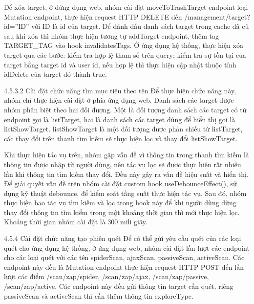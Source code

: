 Để xóa target, ở dứng dụng web, nhóm cài đặt moveToTrashTarget endpoint loại Mutation endpoint, thực hiện request HTTP DELETE đến /management/target?id=”ID” với ID là id của target. Để đánh dấu danh sách target trong cache đã cũ sau khi xóa thì nhóm thực hiện tương tự addTarget endpoint, thêm tag TARGET\_TAG vào hook invalidatesTags. Ở ứng dụng hệ thống, thực hiện xóa target qua các bước: kiểm tra hợp lệ tham số trên query; kiểm tra sự tồn tại của target bằng target id và user id, nếu hợp lệ thì thực hiện cập nhật thuộc tính idDelete của target đó thành true.

4.5.3.2 Cài đặt chức năng tìm mục tiêu theo tên
Để thực hiện chức năng này, nhóm chỉ thực hiện cài đặt ở phía ứng dụng web. Danh sách các target được nhóm phân biệt theo hai đối đượng. Một là đối tượng danh sách các target có từ endpoint gọi là listTarget, hai là danh sách các target dùng để hiển thị gọi là listShowTarget. listShowTarget là một đối tượng được phản chiếu từ listTarget, các thay đổi trên thanh tìm kiếm sẽ thực hiện lọc và thay đổi listShowTarget.

Khi thực hiện tác vụ trên, nhóm gặp vấn đề vì thông tin trong thanh tìm kiếm là thông tin được nhập từ người dùng, nên tác vụ lọc sẽ được thực hiện rất nhiều lần khi thông tin tìm kiếm thay đổi. Đều này gây ra vấn đề hiệu suất và hiển thị. Để giải quyết vấn đề trên nhóm cài đặt custom hook useDebounceEffect(), sử dụng kỹ thuật debounce, để kiểm soát tầng suất thực hiện tác vụ. Sau đó, nhóm thực hiện bao tác vụ tìm kiếm và lọc trong hook này để khi người dùng dừng thay đổi thông tin tìm kiểm trong một khoảng thời gian thì mới thực hiện lọc. Khoảng thời gian nhóm cài đặt là 300 mili giây.

4.5.4 Cài đặt chức năng tạo phiên quét
Để có thể gửi yêu cầu quét của các loại quét cho ứng dụng hệ thống, ở ứng dụng web, nhóm cài đặt lần lượt các endpoint cho các loại quét với các tên spiderScan, ajaxScan, passiveScan, activeScan. Các endpoint này đều là Mutation endpoint thực hiện request HTTP POST đến lần lượt các điểm /scan/zap/spider, /scan/zap/ajax, /scan/zap/passive, /scan/zap/active. Các endpoint này đều gửi thông tin target cần quét, riêng passiveScan và activeScan thì cần thêm thông tin exploreType.

